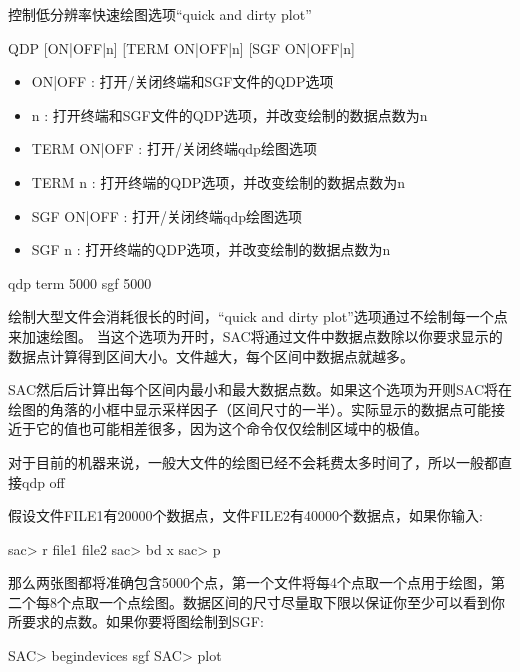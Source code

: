\label{cmd:qdp}

控制低分辨率快速绘图选项``quick and dirty plot''

\begin{SACSTX}
QDP [ON|OFF|n] [TERM ON|OFF|n] [SGF ON|OFF|n]
\end{SACSTX}

\begin{itemize}
\item ON|OFF : 打开/关闭终端和SGF文件的QDP选项 
\item n : 打开终端和SGF文件的QDP选项，并改变绘制的数据点数为n 
\item TERM ON|OFF : 打开/关闭终端qdp绘图选项 
\item TERM n : 打开终端的QDP选项，并改变绘制的数据点数为n 
\item SGF ON|OFF : 打开/关闭终端qdp绘图选项 
\item SGF n : 打开终端的QDP选项，并改变绘制的数据点数为n 
\end{itemize}

\begin{SACDFT}
qdp term 5000 sgf 5000
\end{SACDFT}

绘制大型文件会消耗很长的时间，``quick and dirty plot''选项通过不绘制每一个点来加速绘图。
当这个选项为开时，SAC将通过文件中数据点数除以你要求显示的数据点计算得到区间大小。文件越大，每个区间中数据点就越多。

SAC然后后计算出每个区间内最小和最大数据点数。如果这个选项为开则SAC将在绘图的角落的小框中显示采样因子（区间尺寸的一半）。实际显示的数据点可能接近于它的值也可能相差很多，因为这个命令仅仅绘制区域中的极值。

对于目前的机器来说，一般大文件的绘图已经不会耗费太多时间了，所以一般都直接qdp off

假设文件FILE1有20000个数据点，文件FILE2有40000个数据点，如果你输入:
\begin{SACCode}
sac> r file1 file2
sac> bd x
sac> p
\end{SACCode}

那么两张图都将准确包含5000个点，第一个文件将每4个点取一个点用于绘图，第二个每8个点取一个点绘图。数据区间的尺寸尽量取下限以保证你至少可以看到你所要求的点数。如果你要将图绘制到SGF:
\begin{SACCode}
SAC> begindevices sgf
SAC> plot
\end{SACCode}
